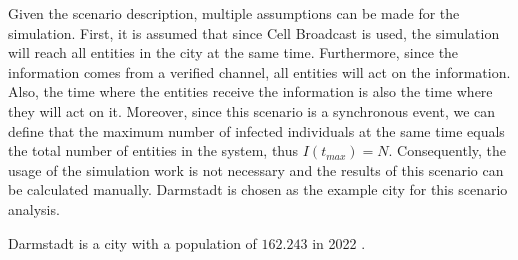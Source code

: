 Given the scenario description, multiple assumptions can be
made for the simulation.
First, it is assumed that since Cell Broadcast is used, the simulation
will reach all entities in the city at the same time.
Furthermore, since the information comes from a verified channel,
all entities will act on the information. Also, the time where the
entities receive the information is also the time where they will act
on it.
Moreover, since this scenario is a synchronous event, we can define that the
maximum number of infected individuals at the same time equals
the total number of entities in the system, thus $I(t_{max})=N$.
Consequently, the usage of the simulation work is not necessary
and the results of this scenario can be calculated manually.
Darmstadt is chosen as the example city for this scenario analysis.

Darmstadt is a city with a population of $162.243$ in 2022 
\cite{statistadarmstadt}.  


